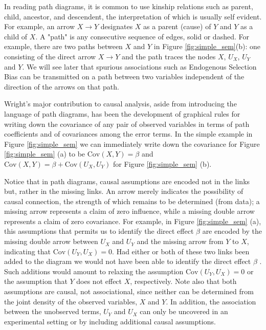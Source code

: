 \documentclass[11pt, oneside]{article}   	%
\newcommand{\Cov}{\mathrm{Cov}}
\begin{document}
\bigskip
\noindent
In reading path diagrams, it is common to use kinship relations such as parent, child, ancestor, and descendent, the interpretation of which is usually self evident. 
For example, an arrow $X \rightarrow Y$ designates $X$ as a parent (cause) of $Y$ and $Y$ as a child of $X$. A "path" is any consecutive sequence of edges, solid 
or dashed. For example, there are two paths between $X$ and $Y$ in Figure  \ref{fig:simple_sem}(b):  one consisting of the direct arrow $X \rightarrow Y$ and the path
traces the nodes $X$, $U_X$, $U_Y$ and $Y$. We will see later that spurious associations such as Endogenous Selection Bias \cite{doi:10.1146/annurev-soc-071913-043455} 
can be transmitted on a path between two variables independent of the direction of the arrows on that path.

\bigskip
\noindent
Wright's major contribution to causal analysis, aside from introducing the language of path diagrams, has been the development of graphical rules for writing down 
the covariance of any pair of observed variables in terms of path coefficients and of covariances among the error terms. In the simple example in Figure \ref{fig:simple_sem}
we can immediately write down the covariance for Figure \ref{fig:simple_sem} (a) to be $\Cov(X,Y) = \beta$ and $\Cov(X,Y) = \beta + \Cov(U_X,U_Y)$ for 
Figure \ref{fig:simple_sem} (b). 

\bigskip
\noindent
Notice that in path diagrams, causal assumptions are encoded not in the links but, rather in the missing links. An arrow merely indicates the possibility of causal connection, 
the strength of which remains to be determined (from data); a missing arrow represents a claim of zero influence, while a missing double arrow represents a claim of 
zero covariance. For example, in Figure \ref{fig:simple_sem} (a), this assumptions that permits us to identify the direct effect $\beta$ are encoded by the missing
double arrow between $U_X$ and $U_Y$ and the missing arrow from $Y$ to $X$, indicating that $\Cov(U_Y,U_X)=0$. Had either or both of these two links been added 
to the diagram we would not have been able to identify the direct effect $\beta$ . Such additions would amount to relaxing the assumption $\Cov(U_Y , U_X ) = 0$ 
or the assumption that $Y$ does not effect $X$, respectively. Note also that both assumptions are causal, not associational, since neither can be determined from the 
joint density of the observed variables, $X$ and $Y$. In addition, the association between the unobserved terms, $U_Y$ and $U_X$ can only be uncovered in an 
experimental setting or by including additional  causal assumptions.
\end{document}
